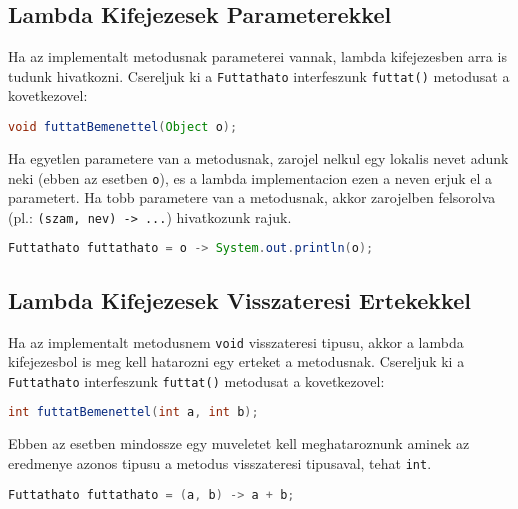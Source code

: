 \documentclass{article}
\let\l\lstinline
\begin{document}
    \newpage

    \subsection{Lambda Kifejezesek Parameterekkel}

    Ha az implementalt metodusnak parameterei vannak, lambda kifejezesben arra is tudunk hivatkozni. Csereljuk ki a \l{Futtathato} interfeszunk \l{futtat()} metodusat a kovetkezovel:

    \begin{lstlisting}[language=Java, caption=Absztrakt metodus parameterrel]
void futtatBemenettel(Object o);
    \end{lstlisting}

    Ha egyetlen parametere van a metodusnak, zarojel nelkul egy lokalis nevet adunk neki (ebben az esetben \l{o}), es a lambda implementacion ezen a neven erjuk el a parametert. Ha tobb parametere van a metodusnak, akkor zarojelben felsorolva (pl.: \l{(szam, nev) -> ...}) hivatkozunk rajuk.

    \begin{lstlisting}[language=Java, caption=Parameteres absztrakt metodus implementalasa lambda kifejezessel]
Futtathato futtathato = o -> System.out.println(o);
    \end{lstlisting}

    \subsection{Lambda Kifejezesek Visszateresi Ertekekkel}

    Ha az implementalt metodusnem \l{void} visszateresi tipusu, akkor a lambda kifejezesbol is meg kell hatarozni egy erteket a metodusnak. Csereljuk ki a \l{Futtathato} interfeszunk \l{futtat()} metodusat a kovetkezovel:

    \begin{lstlisting}[language=Java, caption=Absztrakt metodus visszateresi ertekkel]
int futtatBemenettel(int a, int b);
    \end{lstlisting}

    Ebben az esetben mindossze egy muveletet kell meghataroznunk aminek az eredmenye azonos tipusu a metodus visszateresi tipusaval, tehat \l{int}.

    \begin{lstlisting}[language=Java, caption=Nem void absztrakt metodus implementalasa lambda kifejezessel]
Futtathato futtathato = (a, b) -> a + b;
    \end{lstlisting}
\end{document}
